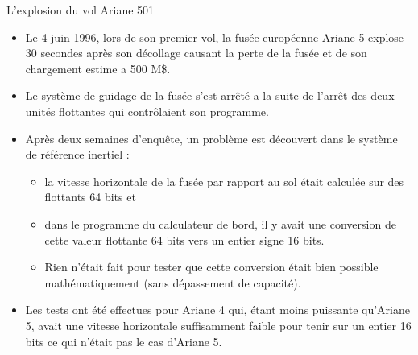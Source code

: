 \documentclass[10pt]{beamer}
\begin{document}
\begin{frame}{L’explosion du vol Ariane 501}
  \begin{itemize}
  \item Le 4 juin 1996, lors de son premier vol, la fusée européenne Ariane 5 explose 30 secondes après son décollage causant la perte de la fusée et de son chargement estime a 500 M\$.
  \item Le système de guidage de la fusée s’est arrêté a la suite de l’arrêt des deux unités flottantes qui contrôlaient son programme.
  \item Après deux semaines d’enquête, un problème est découvert dans le système de référence inertiel :
    \begin{itemize}
    \item la vitesse horizontale de la fusée par rapport au sol était calculée sur des flottants 64 bits et
    \item dans le programme du calculateur de bord, il y avait une conversion de cette valeur flottante 64 bits vers un entier signe 16 bits.
    \item Rien n’était fait pour tester que cette conversion était bien possible mathématiquement (sans dépassement de capacité).
    \end{itemize}
  \item Les tests ont été effectues pour Ariane 4 qui, étant moins puissante qu’Ariane 5, avait une vitesse horizontale suffisamment faible pour tenir sur un entier 16 bits ce qui n’était pas le cas d’Ariane 5.
  \end{itemize}
\end{frame}
\end{document}
